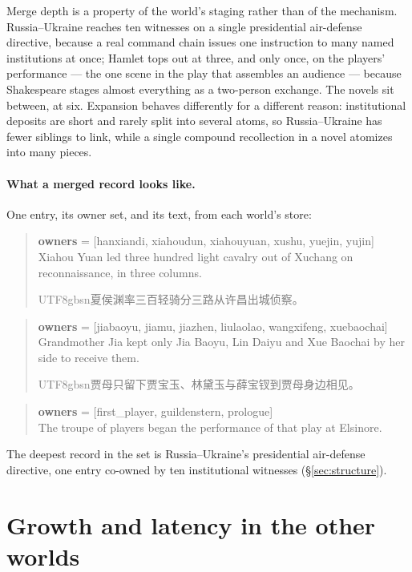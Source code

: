 \documentclass{article}
\newcommand{\zh}[1]{\begin{CJK}{UTF8}{gbsn}#1\end{CJK}}
\begin{document}
Merge depth is a property of the world's staging rather than of the mechanism.
Russia--Ukraine reaches ten witnesses on a single presidential air-defense
directive, because a real command chain issues one instruction to many named
institutions at once; Hamlet tops out at three, and only once, on the players'
performance --- the one scene in the play that assembles an audience ---
because Shakespeare stages almost everything as a two-person exchange. The
novels sit between, at six. Expansion behaves differently for a different
reason: institutional deposits are short and rarely split into several atoms,
so Russia--Ukraine has fewer siblings to link, while a single compound
recollection in a novel atomizes into many pieces.

\paragraph{What a merged record looks like.} One entry, its owner set, and its
text, from each world's store:

\begin{quote}\small
\textbf{owners} = [hanxiandi, xiahoudun, xiahouyuan, xushu, yuejin, yujin]\\
Xiahou Yuan led three hundred light cavalry out of Xuchang on reconnaissance,
in three columns.\quad
\textcolor{gray}{\zh{夏侯渊率三百轻骑分三路从许昌出城侦察。}}
\end{quote}
\begin{quote}\small
\textbf{owners} = [jiabaoyu, jiamu, jiazhen, liulaolao, wangxifeng, xuebaochai]\\
Grandmother Jia kept only Jia Baoyu, Lin Daiyu and Xue Baochai by her side to
receive them.\quad
\textcolor{gray}{\zh{贾母只留下贾宝玉、林黛玉与薛宝钗到贾母身边相见。}}
\end{quote}
\begin{quote}\small
\textbf{owners} = [first\_player, guildenstern, prologue]\\
The troupe of players began the performance of that play at Elsinore.
\end{quote}

The deepest record in the set is Russia--Ukraine's presidential air-defense
directive, one entry co-owned by ten institutional witnesses
(\S\ref{sec:structure}).

\section{Growth and latency in the other worlds}
\label{app:growth}
\end{document}
